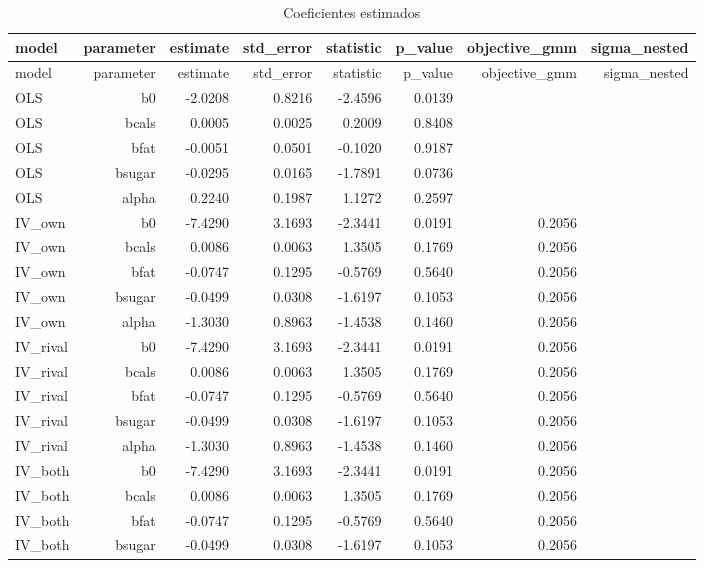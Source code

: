 \begingroup
\scriptsize
\begin{longtable}{@{}lrrrrrrr@{}}
\caption{Coeficientes estimados}\label{tab:all-coef}\\
\toprule
model & parameter & estimate & std\_error & statistic & p\_value & objective\_gmm & sigma\_nested \\
\midrule
\endfirsthead
\toprule
model & parameter & estimate & std\_error & statistic & p\_value & objective\_gmm & sigma\_nested \\
\midrule
\endhead
OLS & b0 & -2.0208 & 0.8216 & -2.4596 & 0.0139 &  &  \\
OLS & bcals & 0.0005 & 0.0025 & 0.2009 & 0.8408 &  &  \\
OLS & bfat & -0.0051 & 0.0501 & -0.1020 & 0.9187 &  &  \\
OLS & bsugar & -0.0295 & 0.0165 & -1.7891 & 0.0736 &  &  \\
OLS & alpha & 0.2240 & 0.1987 & 1.1272 & 0.2597 &  &  \\
IV\_own & b0 & -7.4290 & 3.1693 & -2.3441 & 0.0191 & 0.2056 &  \\
IV\_own & bcals & 0.0086 & 0.0063 & 1.3505 & 0.1769 & 0.2056 &  \\
IV\_own & bfat & -0.0747 & 0.1295 & -0.5769 & 0.5640 & 0.2056 &  \\
IV\_own & bsugar & -0.0499 & 0.0308 & -1.6197 & 0.1053 & 0.2056 &  \\
IV\_own & alpha & -1.3030 & 0.8963 & -1.4538 & 0.1460 & 0.2056 &  \\
IV\_rival & b0 & -7.4290 & 3.1693 & -2.3441 & 0.0191 & 0.2056 &  \\
IV\_rival & bcals & 0.0086 & 0.0063 & 1.3505 & 0.1769 & 0.2056 &  \\
IV\_rival & bfat & -0.0747 & 0.1295 & -0.5769 & 0.5640 & 0.2056 &  \\
IV\_rival & bsugar & -0.0499 & 0.0308 & -1.6197 & 0.1053 & 0.2056 &  \\
IV\_rival & alpha & -1.3030 & 0.8963 & -1.4538 & 0.1460 & 0.2056 &  \\
IV\_both & b0 & -7.4290 & 3.1693 & -2.3441 & 0.0191 & 0.2056 &  \\
IV\_both & bcals & 0.0086 & 0.0063 & 1.3505 & 0.1769 & 0.2056 &  \\
IV\_both & bfat & -0.0747 & 0.1295 & -0.5769 & 0.5640 & 0.2056 &  \\
IV\_both & bsugar & -0.0499 & 0.0308 & -1.6197 & 0.1053 & 0.2056 &  \\

\end{longtable}
